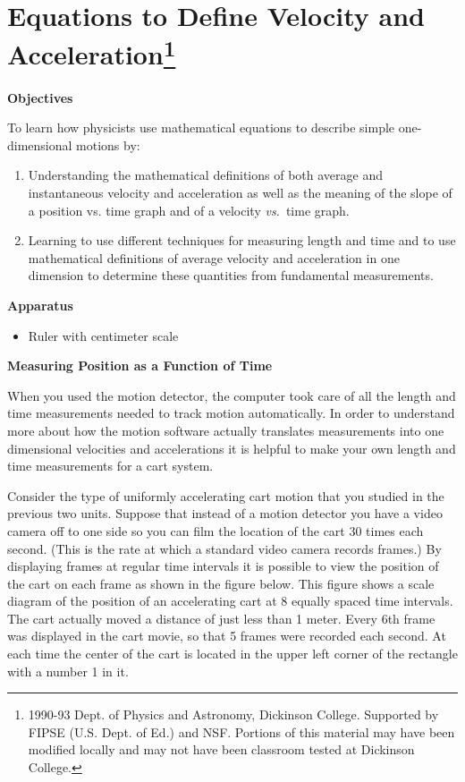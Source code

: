 
\section{Equations to Define Velocity and Acceleration\footnote{
1990-93 Dept. of Physics and Astronomy, Dickinson College. Supported by FIPSE
(U.S. Dept. of Ed.) and NSF. Portions of this material may have been modified
locally and may not have been classroom tested at Dickinson College.
}}

\makelabheader %

\textbf{Objectives} 

To learn how physicists use mathematical equations to describe simple one-dimensional
motions by:

\begin{enumerate}
\item Understanding the mathematical definitions of both average and instantaneous
velocity and acceleration as well as the meaning of the slope of a position
vs. time graph and of a velocity \textit{vs.}~time graph.
\item Learning to use different techniques for measuring length and time and to use
mathematical definitions of average velocity and acceleration in one dimension
to determine these quantities from fundamental measurements.
\end{enumerate}
\textbf{Apparatus} 

\begin{itemize}
\item Ruler with centimeter scale
\end{itemize}
\textbf{Measuring Position as a Function of Time} 

When you used the motion detector, the computer took care of all the length
and time measurements needed to track motion automatically. In order to understand
more about how the motion software actually translates measurements into one
dimensional velocities and accelerations it is helpful to make your own length
and time measurements for a cart system.

Consider the type of uniformly accelerating cart motion that you studied in
the previous two units. Suppose that instead of a motion detector you have a
video camera off to one side so you can film the location of the cart 30 times
each second. (This is the rate at which a standard video camera records frames.)
By displaying frames at regular time intervals it is possible to view the position
of the cart on each frame as shown in the figure below. This figure shows a
scale diagram of the position of an accelerating cart at 8 equally spaced time
intervals. The cart actually moved a distance of just less than 1 meter. Every
6th frame was displayed in the cart movie, so that 5 frames were recorded each
second. At each time the center of the cart is located in the upper left corner
of the rectangle with a number 1 in it. 

